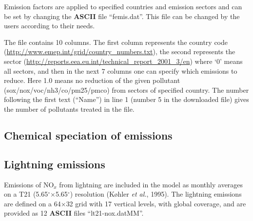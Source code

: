 Emission factors are applied to specified countries and
emission sectors and can be set by changing the {\bf ASCII} file
``femis.dat''. 
This file can be changed by the users according to their needs.

The file contains 10 columns. The first column represents
the country code (\url{http://www.emep.int/grid/country_numbers.txt}),
the second represents the sector
(\url{http://reports.eea.eu.int/technical_report_2001_3/en}) 
where `0' means all sectors, and then in the next 7 columns one can specify
which emissions to reduce. Here 1.0 means no reduction of the given
pollutant 
(sox/nox/voc/nh3/co/pm25/pmco) from sectors of specified country. The
number following the first text (``Name'') in line 1 (number 5 in
the downloaded file) gives the number of pollutants treated in the file.


\subsection{Chemical speciation of emissions}


\subsection{Lightning emissions}
Emissions of NO$_{x}$ from lightning are included in the model
as monthly averages on a T21 (5.65$^{\circ}$$\times$5.65$^{\circ}$) resolution (K{\o}hler {\sl et al.}, 1995). 
The lightning emissions are defined on a 64$\times$32 grid with 17 vertical
levels, with global coverage, and are provided as 12 {\bf ASCII} files
``lt21-nox.datMM''.



